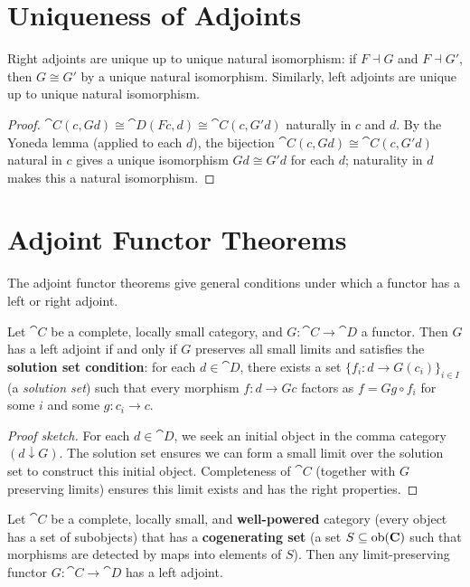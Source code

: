\section{Uniqueness of Adjoints}

\begin{theorem}
Right adjoints are unique up to unique natural isomorphism: if $F \dashv G$ and $F \dashv G'$, then $G \cong G'$ by a unique natural isomorphism. Similarly, left adjoints are unique up to unique natural isomorphism.
\end{theorem}

\begin{proof}
$\cat{C}(c, Gd) \cong \cat{D}(Fc,d) \cong \cat{C}(c, G'd)$ naturally in $c$ and $d$. By the Yoneda lemma (applied to each $d$), the bijection $\cat{C}(c,Gd) \cong \cat{C}(c,G'd)$ natural in $c$ gives a unique isomorphism $Gd \cong G'd$ for each $d$; naturality in $d$ makes this a natural isomorphism.
\end{proof}

\section{Adjoint Functor Theorems}

The adjoint functor theorems give general conditions under which a functor has a left or right adjoint.

\begin{theorem}
\label{thm:gaft}
Let $\cat{C}$ be a complete, locally small category, and $G: \cat{C} \to \cat{D}$ a functor. Then $G$ has a left adjoint if and only if $G$ preserves all small limits and satisfies the \textbf{solution set condition}: for each $d \in \cat{D}$, there exists a set $\{f_i: d \to G(c_i)\}_{i \in I}$ (a \emph{solution set}) such that every morphism $f: d \to Gc$ factors as $f = Gg \circ f_i$ for some $i$ and some $g: c_i \to c$.
\end{theorem}

\begin{proof}[Proof sketch]
For each $d \in \cat{D}$, we seek an initial object in the comma category $(d \downarrow G)$. The solution set ensures we can form a small limit over the solution set to construct this initial object. Completeness of $\cat{C}$ (together with $G$ preserving limits) ensures this limit exists and has the right properties.
\end{proof}

\begin{theorem}
\label{thm:saft}
Let $\cat{C}$ be a complete, locally small, and \textbf{well-powered} category (every object has a set of subobjects) that has a \textbf{cogenerating set} (a set $S \subseteq \operatorname{ob}(\mathbf{C})$ such that morphisms are detected by maps into elements of $S$). Then any limit-preserving functor $G: \cat{C} \to \cat{D}$ has a left adjoint.
\end{theorem}

